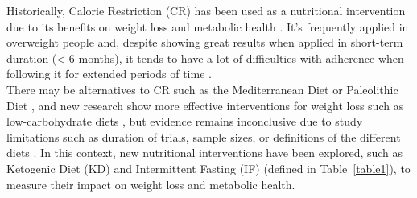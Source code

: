 \documentclass[journal,article,submit,pdftex,moreauthors]{Definitions/mdpi}
\begin{document}
{\color{blue}Historically, Calorie Restriction (CR) has been used as a nutritional intervention due to its benefits on weight loss and metabolic health \cite{yang2022calorie}. It’s frequently applied in overweight people and, despite showing great results when applied in short-term duration (< 6 months), it tends to have a lot of difficulties with adherence when following it for extended periods of time \cite{vasim2022intermittent}.\\

 There may be alternatives to CR such as the Mediterranean Diet or Paleolithic Diet \cite{freire2020scientific}, and new research show more effective interventions for weight loss such as low-carbohydrate diets \cite{sun2023effect}, but evidence remains inconclusive due to study limitations such as duration of trials, sample sizes, or definitions of the different diets \cite{freire2020scientific}.
 In this context, new nutritional interventions have been explored, such as Ketogenic Diet (KD) \cite{nebeling1995effects} and Intermittent Fasting (IF) (defined in Table~\ref{table1}), to measure their impact on weight loss and metabolic health.\\

}
\end{document}
